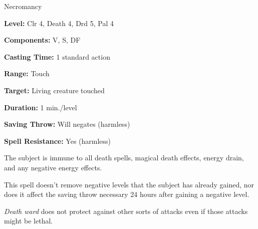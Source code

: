 
Necromancy

\textbf{Level:} Clr 4, Death 4, Drd 5, Pal 4

\textbf{Components:} V, S, DF

\textbf{Casting Time:} 1 standard action

\textbf{Range:} Touch

\textbf{Target:} Living creature touched

\textbf{Duration:} 1 min./level

\textbf{Saving Throw:} Will negates (harmless)

\textbf{Spell Resistance:} Yes (harmless)

The subject is immune to all death spells, magical death effects, energy drain, 
and any negative energy effects.

This spell doesn't remove negative levels that the subject has already gained, 
nor does it affect the saving throw necessary 24 hours after gaining a negative 
level.

\textit{Death ward} does not protect against other sorts of attacks even if those 
attacks might be lethal.


